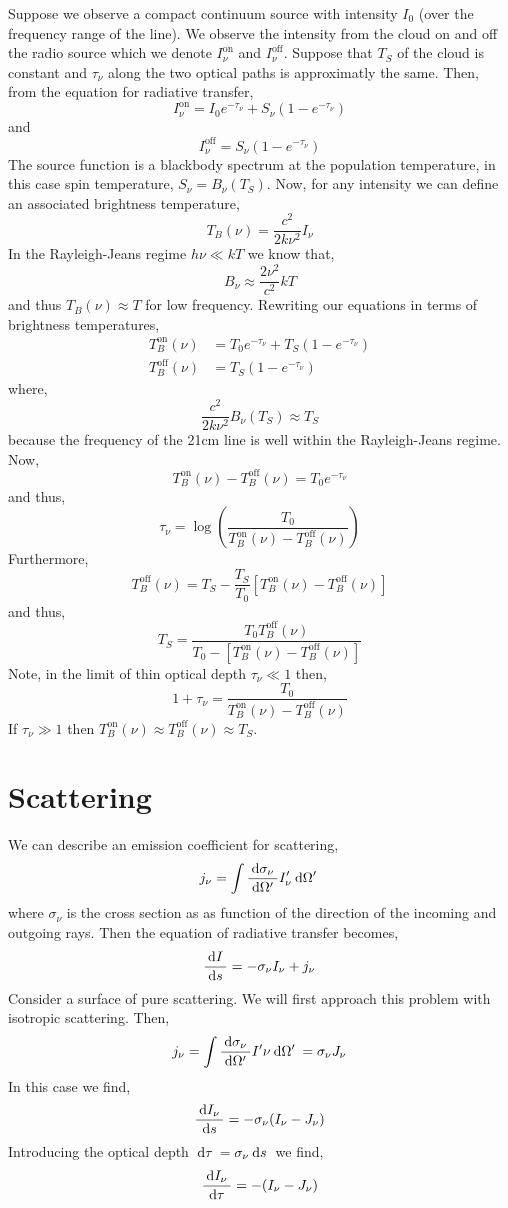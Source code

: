 \documentclass[11pt, a4paper]{article}
\begin{document}
Suppose we observe a compact continuum source with intensity $I_0$ (over the frequency range of the line). We observe the intensity from the cloud on and off the radio source which we denote $I^{\text{on}}_\nu$ and $I^{\text{off}}_\nu$. Suppose that $T_S$ of the cloud is constant and $\tau_\nu$ along the two optical paths is approximatly the same. Then, from the equation for radiative transfer,
\[ I^{\text{on}}_\nu = I_0 e^{-\tau_\nu} + S_\nu (1 - e^{-\tau_\nu}) \]
and 
\[ I^{\text{off}}_\nu = S_\nu (1 - e^{-\tau_\nu}) \]
The source function is a blackbody spectrum at the population temperature, in this case spin temperature, $S_\nu = B_\nu(T_S)$. Now, for any intensity we can define an associated brightness temperature,
\[ T_B(\nu) = \frac{c^2}{2 k \nu^2} I_\nu \]  
In the Rayleigh-Jeans regime $h \nu \ll k T$ we know that,
\[ B_\nu \approx \frac{2 \nu^2}{c^2} kT \]
and thus $T_B(\nu) \approx T$ for low frequency. Rewriting our equations in terms of brightness temperatures,
\begin{align*}
T_B^{\text{on}}(\nu) & = T_0 e^{-\tau_\nu} + T_S (1 - e^{-\tau_\nu})
\\
T_B^{\text{off}}(\nu) & = T_S (1 - e^{-\tau_\nu})
\end{align*}
where,
\[ \frac{c^2}{2 k \nu^2} B_\nu(T_S) \approx T_S \]
because the frequency of the 21cm line is well within the Rayleigh-Jeans regime.
Now,
\[ T_B^{\text{on}}(\nu) - T_B^{\text{off}}(\nu) = T_0 e^{-\tau_\nu} \]
and thus,
\[ \tau_\nu = \log{\left( \frac{T_0}{T_B^{\text{on}}(\nu) - T_B^{\text{off}}(\nu)} \right)} \]
Furthermore,
\[ T_B^{\text{off}}(\nu) = T_S - \frac{T_S}{T_0} [T_B^{\text{on}}(\nu) - T_B^{\text{off}}(\nu)] \]
and thus,
\[ T_S  = \frac{T_0 T_B^{\text{off}}(\nu)}{T_0 - [T_B^{\text{on}}(\nu) - T_B^{\text{off}}(\nu)]} 
\]
Note, in the limit of thin optical depth $\tau_\nu \ll 1$ then,
\[ 1 + \tau_\nu = \frac{T_0}{T_B^{\text{on}}(\nu) - T_B^{\text{off}}(\nu)} \]
If $\tau_\nu \gg 1$ then $T_B^{\text{on}}(\nu) \approx T_B^{\text{off}}(\nu) \approx T_S$.

\section{Scattering}

We can describe an emission coefficient for scattering,
\[ j_\nu = \int \frac{\: \mathrm{d}\sigma_\nu \:}{\: \mathrm{d}\Omega' \:} I'_\nu \: \mathrm{d}\Omega' \: \]
where $\sigma_\nu$ is the cross section as as function of the direction of the incoming and outgoing rays. Then the equation of radiative transfer becomes,
\[ \frac{\: \mathrm{d}I \:}{\: \mathrm{d}s \:} = - \sigma_\nu I_\nu + j_\nu \]
Consider a surface of pure scattering. We will first approach this problem with isotropic scattering. Then,
\[ j_\nu = \int \frac{\: \mathrm{d}\sigma_\nu \:}{\: \mathrm{d}\Omega' \:} I' \nu \: \mathrm{d}\Omega' \: = \sigma_\nu J_\nu \] 
In this case we find,
\[ \frac{\: \mathrm{d}I_\nu \:}{\: \mathrm{d}s \:} = - \sigma_\nu (I_\nu - J_\nu) \]
Introducing the optical depth $\: \mathrm{d}\tau \: = \sigma_\nu \: \mathrm{d}s \:$ we find,
\[ \frac{\: \mathrm{d}I_\nu \:}{\: \mathrm{d}\tau \:} = - (I_\nu - J_\nu) \]
\end{document}
